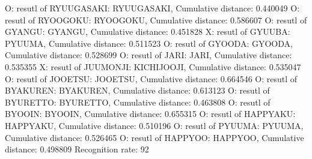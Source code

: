 O: resutl of RYUUGASAKI: RYUUGASAKI, Cumulative distance: 0.440049
O: resutl of RYOOGOKU: RYOOGOKU, Cumulative distance: 0.586607
O: resutl of GYANGU: GYANGU, Cumulative distance: 0.451828
X: resutl of GYUUBA: PYUUMA, Cumulative distance: 0.511523
O: resutl of GYOODA: GYOODA, Cumulative distance: 0.528699
O: resutl of JARI: JARI, Cumulative distance: 0.535355
X: resutl of JUUMONJI: KICHIJOOJI, Cumulative distance: 0.535047
O: resutl of JOOETSU: JOOETSU, Cumulative distance: 0.664546
O: resutl of BYAKUREN: BYAKUREN, Cumulative distance: 0.613123
O: resutl of BYURETTO: BYURETTO, Cumulative distance: 0.463808
O: resutl of BYOOIN: BYOOIN, Cumulative distance: 0.655315
O: resutl of HAPPYAKU: HAPPYAKU, Cumulative distance: 0.510196
O: resutl of PYUUMA: PYUUMA, Cumulative distance: 0.526465
O: resutl of HAPPYOO: HAPPYOO, Cumulative distance: 0.498809
Recognition rate: 92%
